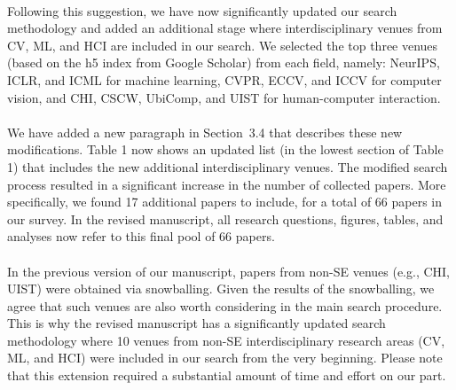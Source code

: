 \documentclass[12pt]{article}
\newcommand\response[1]{\textcolor{responseColor}{\\#1\\}}
\begin{document}
\response{
Following this suggestion, we have now 
significantly updated our search methodology and added 
an additional stage where interdisciplinary venues from 
CV, ML, and HCI are included in our search. We selected 
the top three venues (based on the h5 index from Google Scholar) from each 
field, namely: NeurIPS, ICLR, and ICML for machine 
learning, CVPR, ECCV, and ICCV for computer vision, and 
CHI, CSCW, UbiComp, and UIST for human-computer 
interaction.
\\ \\
We have added a new paragraph in Section~3.4 that 
describes these new modifications. Table 1 now shows an 
updated list (in the lowest section of Table 1) that includes 
the new additional 
interdisciplinary venues. The modified search process 
resulted in a significant increase in the number of 
collected papers. More specifically, we found 17 additional 
papers to include, for a total of 66 papers in our survey. In the 
revised manuscript, all research 
questions, figures, tables, and analyses now refer to 
this final pool of 66 papers.
\\ \\
In the previous version of our manuscript, papers 
from non-SE venues (e.g., CHI, UIST) were obtained 
via snowballing. 
Given the results of the snowballing, we agree that such venues are also worth considering in 
the main search procedure. 
This is why the revised manuscript has a significantly 
updated search methodology where 10 venues from non-SE 
interdisciplinary research areas (CV, ML, and HCI) were 
included in our search from the very beginning. Please note 
that this extension required a substantial amount of time and effort on our part.
}
\end{document}
